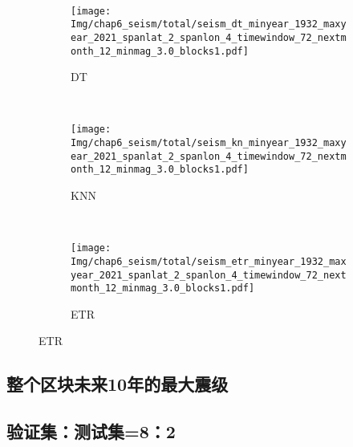 \begin{figure}[!htbp]
\begin{subfigure}[b]{0.45\textwidth}
    \vspace{-1cm}
    \label{fig:seism_gbr_minyear_1932_maxyear_2021_spanlat_2_spanlon_4_timewindow_72_nextmonth_12_minmag_3.0_blocks1}
  \end{subfigure}
  ~
  \begin{subfigure}[b]{0.45\textwidth}
    \caption{DT}
    \vspace{-0.2cm}
    \texttt{[image: Img/chap6\_seism/total/seism\_dt\_minyear\_1932\_maxyear\_2021\_spanlat\_2\_spanlon\_4\_timewindow\_72\_nextmonth\_12\_minmag\_3.0\_blocks1.pdf]}
    \vspace{-1cm}
    \label{fig:seism_dt_minyear_1932_maxyear_2021_spanlat_2_spanlon_4_timewindow_72_nextmonth_12_minmag_3.0_blocks1}
  \end{subfigure}
  \\
  \begin{subfigure}[b]{0.45\textwidth}
    \caption{KNN}
    \vspace{-0.2cm}
    \texttt{[image: Img/chap6\_seism/total/seism\_kn\_minyear\_1932\_maxyear\_2021\_spanlat\_2\_spanlon\_4\_timewindow\_72\_nextmonth\_12\_minmag\_3.0\_blocks1.pdf]}
    \vspace{-1cm}
    \label{fig:seism_knn_minyear_1932_maxyear_2021_spanlat_2_spanlon_4_timewindow_72_nextmonth_12_minmag_3.0_blocks1}
  \end{subfigure}
  ~
  \begin{subfigure}[b]{0.45\textwidth}
    \caption{ETR}
    \vspace{-0.2cm}
    \texttt{[image: Img/chap6\_seism/total/seism\_etr\_minyear\_1932\_maxyear\_2021\_spanlat\_2\_spanlon\_4\_timewindow\_72\_nextmonth\_12\_minmag\_3.0\_blocks1.pdf]}
    \vspace{-1cm}
    \label{fig:seism_etr_minyear_1932_maxyear_2021_spanlat_2_spanlon_4_timewindow_72_nextmonth_12_minmag_3.0_blocks1}
  \end{subfigure}
  \label{fig:seism_minyear_1932_maxyear_2021_spanlat_2_spanlon_4_timewindow_72_nextmonth_12_minmag_3.0_blocks1}
\end{figure}


\subsection{整个区块未来10年的最大震级}\label{sec:seism_result_10}

\subsection{验证集：测试集=8：2}\label{sec:seism_result_10_80}

